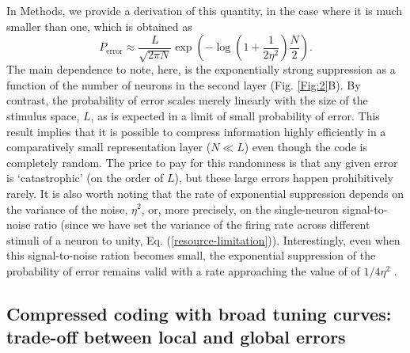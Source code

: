 \documentclass[a4paper]{article}%
\begin{document}
In Methods, we provide a derivation of this quantity, in the case where it is much smaller than one, which is obtained as
\begin{equation}
P_{\text{error}}\approx\frac{L}{\sqrt{2\pi N}}\exp\left(  -{\log}\left(
{1+\frac{1}{2\eta^{2}}}\right)  {\frac{N}{2}}\right)  .\label{Eq:PGE}
\end{equation}
The main dependence to note, here, is the exponentially strong suppression as
a function of the number of neurons in the second layer (Fig.  \ref{Fig:2}B).
By contrast, the probability of error scales merely linearly with the size of
the stimulus space, $L$, as is expected in a limit of small probability of
error. This result implies that it is possible to compress information highly
efficiently in a comparatively small representation layer ($N\ll L$) even
though the code is completely random. The price to pay for this randomness is
that any given error is `catastrophic' (on the order of $L$), but these large
errors happen prohibitively rarely. It is also worth noting that the rate of
exponential suppression depends on the variance of the noise, $\eta^{2}$, or,
more precisely, on the single-neuron signal-to-noise ratio (since we have set
the variance of the firing rate across different stimuli of a neuron to unity, Eq. (\ref{resource-limitation})).
Interestingly, even when this signal-to-noise ration becomes small, the
exponential suppression of the probability of error remains valid with a rate
approaching the value of of $1/4\eta^2$ .

\subsection{Compressed coding with broad tuning curves: trade-off between
local and global errors}
\end{document}
